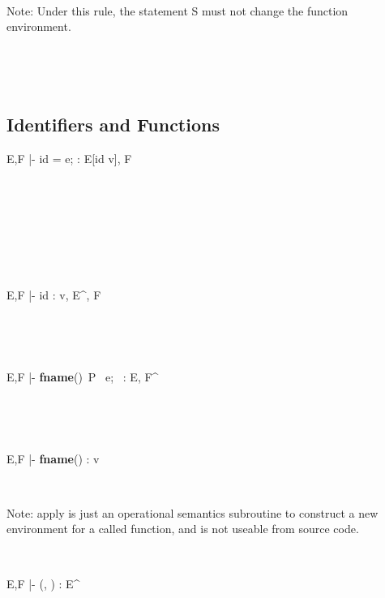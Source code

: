 \documentclass[12pt,letterpaper]{article}
\begin{document}
\
   
Note: Under this rule, the statement S must not change the function environment.


\ 

\

\subsection{Identifiers and Functions}

		   {E,F |- id = e; : E[id \leftarrow v], F}
		   
		   
\ 

\ 


		   
		   
\ 

\ 

		   {E,F |- id : v, E^\prime, F}
		   
\

\

		   
{E,F |-  \textbf{fname}()\ P\  e;\  : E, F^\prime}
		   
\

\

{E,F |- \textbf{fname}() : v}


\

Note: apply is just an operational semantics subroutine to construct a new environment for a called function, and is not useable from source code.


\

           {E,F |- (, ) : E^{\prime\prime}}
           
\end{document}
